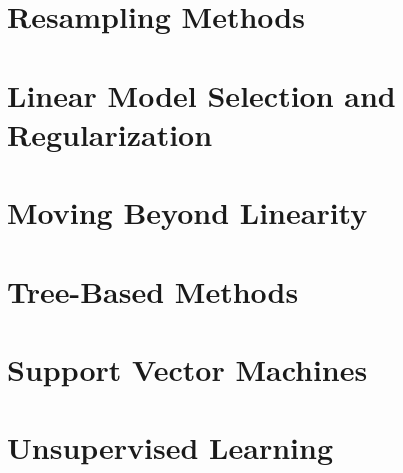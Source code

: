 \documentclass[12pt,a4paper]{article}
\begin{document}
\section{Resampling Methods}
\section{Linear Model Selection and Regularization}
\section{Moving Beyond Linearity}
\section{Tree-Based Methods}
\section{Support Vector Machines}
\section{Unsupervised Learning}
\end{document}
